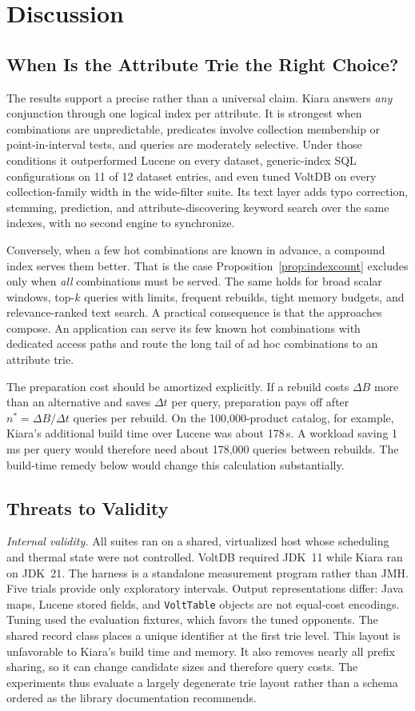 \section{Discussion}
\label{sec:discussion}

\subsection{When Is the Attribute Trie the Right Choice?}
The results support a precise rather than a universal claim. Kiara answers \emph{any} conjunction through one logical index per attribute. It is strongest when combinations are unpredictable, predicates involve collection membership or point-in-interval tests, and queries are moderately selective. Under those conditions it outperformed Lucene on every dataset, generic-index SQL configurations on 11 of 12 dataset entries, and even tuned VoltDB on every collection-family width in the wide-filter suite. Its text layer adds typo correction, stemming, prediction, and attribute-discovering keyword search over the same indexes, with no second engine to synchronize.

Conversely, when a few hot combinations are known in advance, a compound index serves them better. That is the case Proposition~\ref{prop:indexcount} excludes only when \emph{all} combinations must be served. The same holds for broad scalar windows, top-$k$ queries with limits, frequent rebuilds, tight memory budgets, and relevance-ranked text search. A practical consequence is that the approaches compose. An application can serve its few known hot combinations with dedicated access paths and route the long tail of ad hoc combinations to an attribute trie.

The preparation cost should be amortized explicitly. If a rebuild costs $\Delta B$ more than an alternative and saves $\Delta t$ per query, preparation pays off after $n^\ast=\Delta B/\Delta t$ queries per rebuild. On the 100,000-product catalog, for example, Kiara's additional build time over Lucene was about 178\,s. A workload saving 1\,ms per query would therefore need about 178,000 queries between rebuilds. The build-time remedy below would change this calculation substantially.

\subsection{Threats to Validity}
\emph{Internal validity.} All suites ran on a shared, virtualized host whose scheduling and thermal state were not controlled. VoltDB required JDK~11 while Kiara ran on JDK~21. The harness is a standalone measurement program rather than JMH. Five trials provide only exploratory intervals. Output representations differ: Java maps, Lucene stored fields, and \texttt{VoltTable} objects are not equal-cost encodings. Tuning used the evaluation fixtures, which favors the tuned opponents. The shared record class places a unique identifier at the first trie level. This layout is unfavorable to Kiara's build time and memory. It also removes nearly all prefix sharing, so it can change candidate sizes and therefore query costs. The experiments thus evaluate a largely degenerate trie layout rather than a schema ordered as the library documentation recommends.

